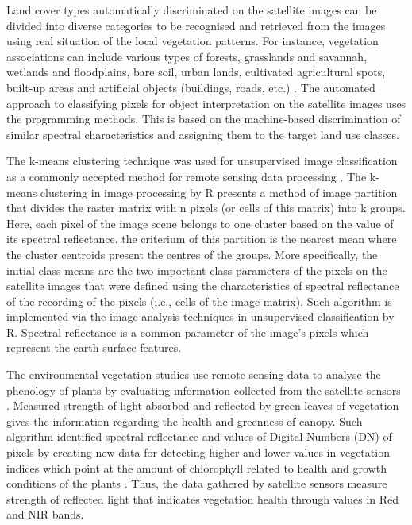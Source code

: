 \documentclass[12pt,a4paper,oneside]{article}
\def \newpar{\vspace{6pt}}
\begin{document}
\newpar Land cover types automatically discriminated on the satellite images can be divided into diverse categories to be recognised and retrieved from the images using real situation of the local vegetation patterns. For instance, vegetation associations can include various types of forests, grasslands and savannah, wetlands and floodplains, bare soil, urban lands, cultivated agricultural spots, built-up areas and artificial objects (buildings, roads, etc.) \citep{lillesand1994remote}. The automated approach to classifying pixels for object interpretation on the satellite images uses the programming methods. This is based on the machine-based discrimination of similar spectral characteristics and assigning them to the target land use classes.

\newpar The k-means clustering technique was used for unsupervised image classification as a commonly accepted method for remote sensing data processing \citep{PAOLAPATRICIA2020129,1027191,BOVOLO2018156,HOU201625}. The k-means clustering in image processing by R presents a method of image partition that divides the raster matrix with n pixels (or cells of this matrix) into k groups. Here, each pixel of the image scene belongs to one cluster based on the value of its spectral reflectance. the criterium of this partition is the nearest mean where the cluster centroids present the centres of the groups. More specifically, the initial class means are the two important class parameters of the pixels on the satellite images that were defined using the characteristics of spectral reflectance of the recording of the pixels (i.e., cells of the image matrix). Such algorithm is implemented via the image analysis techniques in unsupervised classification by R. Spectral reflectance is a common parameter of the image's pixels which represent the earth surface features.

\newpar The environmental vegetation studies use remote sensing data to analyse the phenology of plants by evaluating information collected from the satellite sensors \citep{rs9050463,rs9050485}. Measured strength of light absorbed and reflected by green leaves of vegetation gives the information regarding the health and greenness of canopy. Such algorithm identified spectral reflectance and values of Digital Numbers (DN) of pixels by creating new data for detecting higher and lower values in vegetation indices which point at the amount of chlorophyll related to health and growth conditions of the plants \citep{jmse11040871,jimaging9050093}. Thus, the data gathered by satellite sensors measure strength of reflected light that indicates vegetation health through values in Red and NIR bands.
\end{document}
